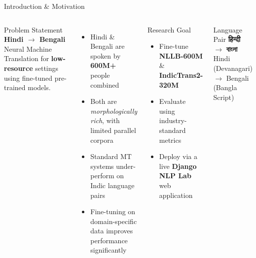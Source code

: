 \documentclass[aspectratio=169]{beamer}
\begin{document}
\begin{frame}{Introduction \& Motivation}
\begin{columns}[T]
    \begin{block}{Problem Statement}
      \textbf{Hindi $\rightarrow$ Bengali} Neural Machine Translation for \textbf{low-resource} settings using fine-tuned pre-trained models.
    \end{block}
    \vspace{0.5em}
    \begin{itemize}
      \item[\faGlobe] Hindi \& Bengali are spoken by \textbf{600M+} people combined
      \item[\faExclamationTriangle] Both are \textit{morphologically rich}, with limited parallel corpora
      \item[\faBrain] Standard MT systems under-perform on Indic language pairs
      \item[\faFlask] Fine-tuning on domain-specific data improves performance significantly
    \end{itemize}
    \begin{alertblock}{Research Goal}
      \begin{itemize}
        \item Fine-tune \textbf{NLLB-600M} \& \textbf{IndicTrans2-320M}
        \item Evaluate using industry-standard metrics
        \item Deploy via a live \textbf{Django NLP Lab} web application
      \end{itemize}
    \end{alertblock}
    \vspace{0.5em}
    \begin{block}{Language Pair}
      \centering
      \Large \textbf{हिन्दी} $\longrightarrow$ \textbf{বাংলা}\\
      \small Hindi (Devanagari) $\rightarrow$ Bengali (Bangla Script)
    \end{block}
\end{columns}
\end{frame}
\end{document}
